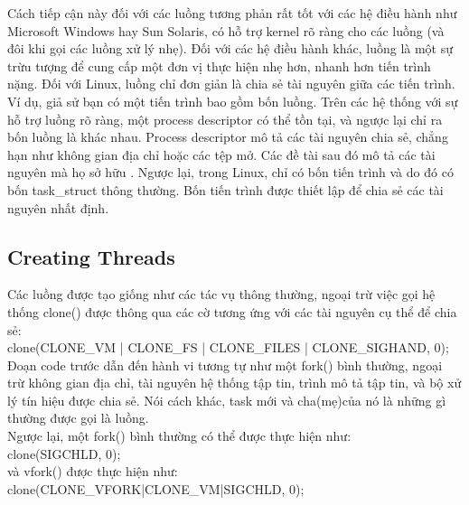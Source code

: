 \documentclass[a4paper,10pt]{report}
\begin{document}
Cách tiếp cận này đối với các luồng tương phản rất tốt với các hệ điều hành như Microsoft Windows hay Sun Solaris, có hỗ trợ kernel rõ ràng cho các luồng (và đôi khi gọi các luồng xử lý nhẹ). Đối với các hệ điều hành khác, luồng là một sự trừu tượng để cung cấp một đơn vị thực hiện nhẹ hơn, nhanh hơn tiến trình nặng. Đối với Linux, luồng chỉ đơn giản là chia sẻ tài nguyên giữa các tiến trình. Ví dụ, giả sử bạn có một tiến trình bao gồm bốn luồng. Trên các hệ thống với sự hỗ trợ luồng rõ ràng, một process descriptor có thể tồn tại, và ngược lại chỉ ra bốn luồng là khác nhau. Process descriptor mô tả các tài nguyên chia sẻ, chẳng hạn như không gian địa chỉ hoặc các tệp mở. Các đề tài sau đó mô tả các tài nguyên mà họ sở hữu . Ngược lại, trong Linux, chỉ có bốn tiến trình và do đó có bốn task\_struct thông thường. Bốn tiến trình được thiết lập để chia sẻ các tài nguyên nhất định.

\subsection{Creating Threads}
Các luồng được tạo giống như các tác vụ thông thường, ngoại trừ việc gọi hệ thống clone() được thông qua các cờ tương ứng với các tài nguyên cụ thể để chia sẻ: \\
clone(CLONE\_VM | CLONE\_FS | CLONE\_FILES | CLONE\_SIGHAND, 0); \\

Đoạn code trước dẫn đến hành vi tương tự như một fork() bình thường, ngoại trừ không gian địa chỉ, tài nguyên hệ thống tập tin, trình mô tả tập tin, và bộ xử lý tín hiệu được chia sẻ. Nói cách khác, task mới và cha(mẹ)của nó là những gì thường được gọi là luồng. \\

Ngược lại, một fork() bình thường có thể được thực hiện như: \\
clone(SIGCHLD, 0); \\

và vfork() được thực hiện như: \\
clone(CLONE\_VFORK|CLONE\_VM|SIGCHLD, 0); \\
\end{document}
